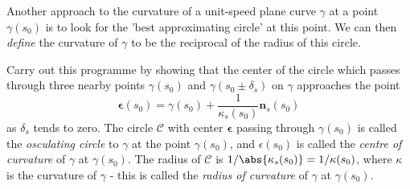 \begin{problem}
 Another approach to the curvature of a unit-speed plane curve $\gamma$ at a point $\gamma(s_0)$ is to look for the 
'best approximating circle' at this point. We can then \textit{define} the curvature of $\gamma$ to be the reciprocal of the radius of this circle.

Carry out this programme by showing that the center of the circle which passes through three nearby points $\gamma(s_0)$ and $\gamma(s_0\pm \delta_s)$ on $
\gamma$ approaches the point
\begin{equation}\label{eq:center_of_circle}
\bm{\epsilon}(s_0) = \gamma(s_0) + \frac{1}{\kappa_s(s_0)}\bm{n}_s(s_0)
\end{equation}
as $\delta_s$ tends to zero. The circle $\mathcal{C}$ with center $\bm{\epsilon}$ passing through $\gamma(s_0)$ is called the \textit{osculating circle} to $\gamma$ at the point $\gamma(s_0)$, and $\epsilon(s_0)$ is called the \textit{centre of curvature} of $\gamma$ at $\gamma(s_0)$. The radius of $\mathcal{C}$
is $1/\abs{\kappa_s(s_0)}=1/\kappa(s_0)$, where $\kappa$ is the curvature of $\gamma$ - this is called the \textit{radius of curvature} of $\gamma$ at $\gamma(s_0)$.
\end{problem}
